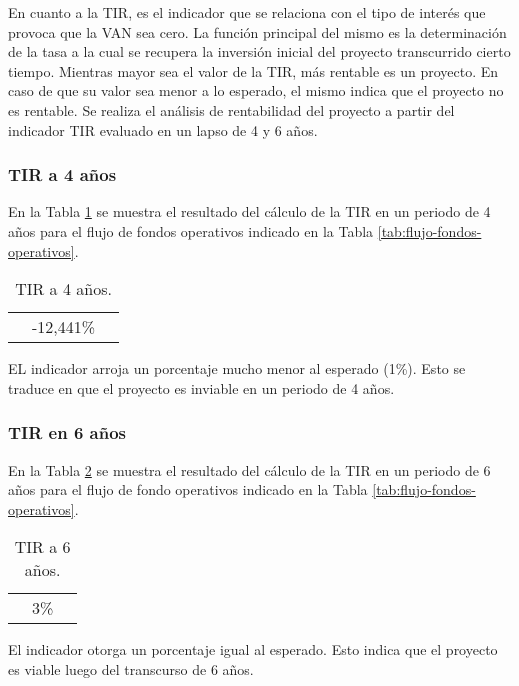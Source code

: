 En cuanto a la TIR, es el indicador que se relaciona con el tipo de interés que provoca que la VAN sea cero. La función principal del mismo es la determinación de la tasa a la cual se recupera la inversión inicial del proyecto transcurrido cierto tiempo. Mientras mayor sea el valor de la TIR, más rentable es un proyecto. En caso de que su valor sea menor a lo esperado, el mismo indica que el proyecto no es rentable. Se realiza el análisis de rentabilidad del proyecto a partir del indicador TIR evaluado en un lapso de 4 y 6 años.

\subsubsection{TIR a 4 años}

En la Tabla \ref{tab:tir-4} se muestra el resultado del cálculo de la TIR en un periodo de 4 años para el flujo de fondos operativos indicado en la Tabla \ref{tab:flujo-fondos-operativos}.

\begin{table}[H]
  \centering
    \begin{tabular}{|cc|r|}
    \rowcolor[rgb]{ .773,  .851,  .945} \multicolumn{3}{c}{\textbf{a 4 años}} \bigstrut[b]\\
    \hline
    \rowcolor[rgb]{ .773,  .851,  .945} \multicolumn{2}{|c|}{\textbf{TIR}} & \cellcolor[rgb]{ 1,  1,  1}\textcolor[rgb]{ 1,  0,  0}{-12,441\%} \bigstrut\\
    \hline
    \end{tabular}%
  \caption{TIR a 4 años.}    
  \label{tab:tir-4}%
\end{table}%


EL indicador arroja un porcentaje mucho menor al esperado (1\%). Esto se traduce en que el proyecto es inviable en un periodo de 4 años.

\subsubsection{TIR en 6 años}

En la Tabla \ref{tab:tir-6} se muestra el resultado del cálculo de la TIR en un periodo de 6 años para el flujo de fondo operativos indicado en la Tabla \ref{tab:flujo-fondos-operativos}.

\begin{table}[H]
  \centering
    \begin{tabular}{|cc|r|}
    \rowcolor[rgb]{ .773,  .851,  .945} \multicolumn{3}{c}{\textbf{a 6 años}} \bigstrut[b]\\
    \hline
    \rowcolor[rgb]{ .773,  .851,  .945} \multicolumn{2}{|c|}{\textbf{TIR}} & \cellcolor[rgb]{ 1,  1,  1}3\% \bigstrut\\
    \hline
    \end{tabular}%
  \caption{TIR a 6 años.}    
  \label{tab:tir-6}%
\end{table}%


El indicador otorga un porcentaje igual al esperado. Esto indica que el proyecto es viable luego del transcurso de 6 años.